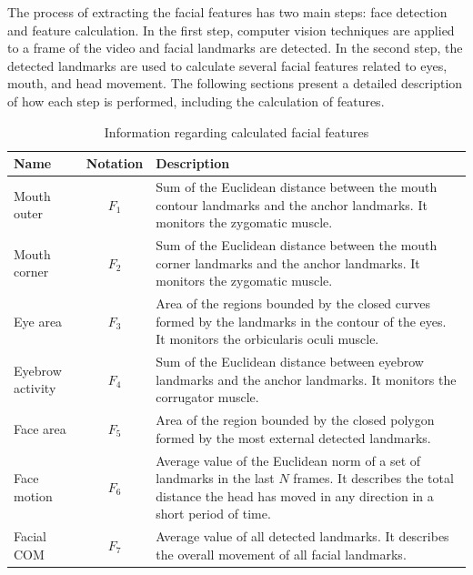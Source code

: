 The process of extracting the facial features has two main steps: face detection and feature calculation. In the first step, computer vision techniques are applied to a frame of the video and facial landmarks are detected. In the second step, the detected landmarks are used to calculate several facial features related to eyes, mouth, and head movement. The following sections present a detailed description of how each step is performed, including the calculation of features.


\begin{landscape}
\begin{table}
    \centering
    \caption{Information regarding calculated facial features}
    \label{table:features}
    \begin{tabular}[l]{@{}lcp{11cm}}
        \toprule%
            \textbf{Name} & \textbf{Notation} & \textbf{Description} \\
        \midrule%
            Mouth outer & $F_1$ & Sum of the Euclidean distance between the mouth contour landmarks and the anchor landmarks. It monitors the zygomatic muscle.  \\
            Mouth corner & $F_2$ & Sum of the Euclidean distance between the mouth corner landmarks and the anchor landmarks. It monitors the zygomatic muscle. \\
            Eye area & $F_3$ & Area of the regions bounded by the closed curves formed by the landmarks in the contour of the eyes. It monitors the orbicularis oculi muscle. \\
            Eyebrow activity & $F_4$ & Sum of the Euclidean distance between eyebrow landmarks and the anchor landmarks. It monitors the corrugator muscle.  \\
            Face area & $F_5$ & Area of the region bounded by the closed polygon formed by the most external detected landmarks.  \\
            Face motion & $F_6$ & Average value of the Euclidean norm of a set of landmarks in the last $N$ frames. It describes the total distance the head has moved in any direction in a short period of time.  \\
            Facial COM & $F_7$ & Average value of all detected landmarks. It describes the overall movement of all facial landmarks.  \\
        \bottomrule%
    \end{tabular}
\end{table}
\end{landscape}

